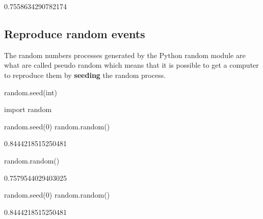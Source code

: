 \begin{raw}
0.7558634290782174
\end{raw}






\subsection{Reproduce random events}
\label{\detokenize{tools-for-mathematics/06-probability/how/main:reproduce-random-events}}\label{\detokenize{tools-for-mathematics/06-probability/how/main:id4}}

The random numbers processes generated by the Python random module are what are
called pseudo random which means that it is possible to get a computer to reproduce them by
\textbf{seeding} the random process.


\begin{pyin}
random.seed(int)
\end{pyin}





\begin{pyin}
import random

random.seed(0)
random.random()
\end{pyin}





\begin{raw}
0.8444218515250481
\end{raw}







\begin{pyin}
random.random()
\end{pyin}





\begin{raw}
0.7579544029403025
\end{raw}







\begin{pyin}
random.seed(0)
random.random()
\end{pyin}





\begin{raw}
0.8444218515250481
\end{raw}


